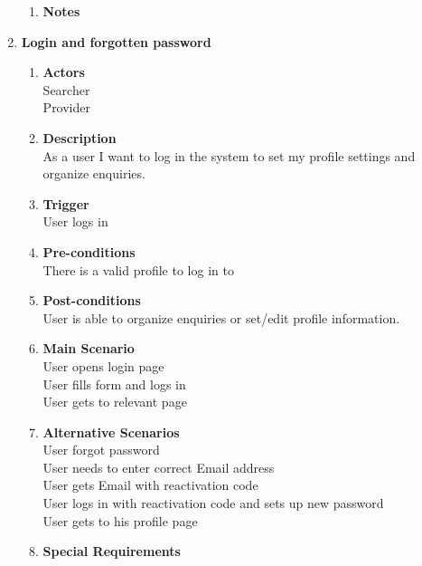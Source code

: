 \documentclass{scrreprt}
\begin{document}
\begin{enumerate}
\begin{enumerate}
		\item \textbf{Notes} \\
	\end{enumerate}

	\item \textbf{Login and forgotten password}
	\begin{enumerate}
		\item \textbf{Actors}  \\
			Searcher \\
			Provider \\

		\item \textbf{Description} \\
			As a user I want to log in the system to set my profile settings and organize enquiries. \\
			
		\item \textbf{Trigger} \\
			User logs in\\

		\item \textbf{Pre-conditions} \\
			There is a valid profile to log in to\\

		\item \textbf{Post-conditions} \\
			User is able to organize enquiries or set/edit profile information.\\

		\item \textbf{Main Scenario} \\
			User opens login page \\
			User fills form and logs in \\
			User gets to relevant page \\

		\item \textbf{Alternative Scenarios} \\
			User forgot password\\
			User needs to enter correct Email address\\
			User gets Email with reactivation code\\
			User logs in with reactivation code and sets up new password\\
			User gets to his profile page\\
		\item \textbf{Special Requirements} \\


\end{enumerate}
\end{enumerate}
\end{document}
